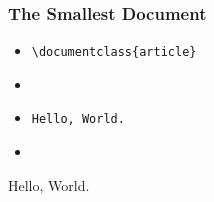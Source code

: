 \begin{frame}[fragile]
  \frametitle{The Smallest Document}
\begin{multicols}{2}
\begin{itemize}
	\item[]<1-> \verb|\documentclass{article}|
	\item[]<2-> \verb||
	\item[]<3-> \verb|Hello, World.|
	\item[]<4-> \verb||   
\end{itemize}
\columnbreak

\begin{center}
\pause
\pause
\pause
\pause
\begin{framed}
\begin{minipage}{0.7\columnwidth}
Hello, World.
\vspace{5cm}
\end{minipage}
\end{framed}
\end{center}
\end{multicols}
\end{frame}


